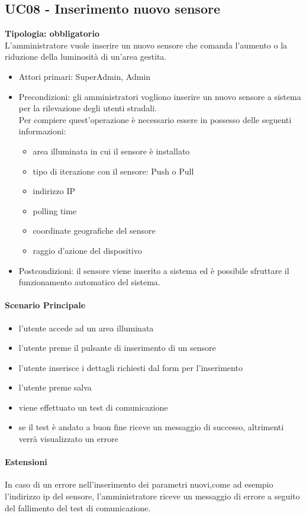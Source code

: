 \documentclass[12pt]{article}
\begin{document}
\subsection{UC08 - Inserimento nuovo sensore}
\textbf{Tipologia: obbligatorio}\\
L'amministratore vuole inserire un nuovo sensore che comanda l'aumento o la riduzione della luminosità di un'area gestita.
\begin{itemize}
	\item Attori primari: SuperAdmin, Admin
	\item Precondizioni: gli amministratori vogliono inserire un nuovo sensore a sistema per la rilevazione degli utenti stradali.\\
	 Per compiere quest'operazione è necessario essere in possesso delle seguenti informazioni: 
	\begin{itemize}
		\item area illuminata in cui il sensore è installato
		\item tipo di iterazione con il sensore: Push o Pull
		\item indirizzo IP
		\item polling time
		\item coordinate geografiche del sensore
		\item raggio d'azione del dispositivo
	\end{itemize}
	\item Postcondizioni: il sensore viene inserito a sistema ed è possibile sfruttare il funzionamento automatico del sistema.
\end{itemize}
\paragraph{Scenario Principale}
\begin{itemize}
	\item l'utente accede ad un area illuminata
	\item l'utente preme il pulsante di inserimento di un sensore
	\item l'utente inserisce i dettagli richiesti dal form per l'inserimento
	\item l'utente preme salva
	\item viene effettuato un test di comunicazione
	\item se il test è andato a buon fine riceve un messaggio di successo, altrimenti verrà visualizzato un errore
\end{itemize}
\paragraph{Estensioni} In caso di un errore nell'inserimento dei parametri nuovi,come ad esempio l'indirizzo ip del sensore,  l'amministratore riceve un messaggio di errore a seguito del fallimento del test di comunicazione.
\end{document}
